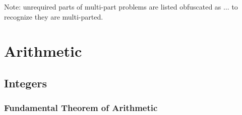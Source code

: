 \documentclass[12pt]{article}
\numberwithin{problem}{section} %
\theoremstyle{remark}  %
\begin{document}
 
%
\rhead{\today}
Note: unrequired parts of multi-part problems are listed obfuscated as $\dots$ to recognize they are multi-parted.

\section{Arithmetic}
\subsection{Integers}
\setcounter{subsubsection}{4}
\subsubsection{Fundamental Theorem of Arithmetic}
\end{document}
